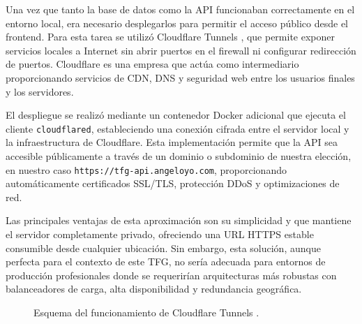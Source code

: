 Una vez que tanto la base de datos como la API funcionaban correctamente en el entorno local, era necesario desplegarlos para permitir el acceso público desde el frontend. Para esta tarea se utilizó Cloudflare Tunnels \cite{cloudflaretunnels}, que permite exponer servicios locales a Internet sin abrir puertos en el firewall ni configurar redirección de puertos. Cloudflare \cite{cloudflare} es una empresa que actúa como intermediario proporcionando servicios de CDN, DNS y seguridad web entre los usuarios finales y los servidores.

El despliegue se realizó mediante un contenedor Docker adicional que ejecuta el cliente \texttt{cloudflared}, estableciendo una conexión cifrada entre el servidor local y la infraestructura de Cloudflare. Esta implementación permite que la API sea accesible públicamente a través de un dominio o subdominio de nuestra elección, en nuestro caso \texttt{https://tfg-api.angeloyo.com}, proporcionando automáticamente certificados SSL/TLS, protección DDoS y optimizaciones de red.

Las principales ventajas de esta aproximación son su simplicidad y que mantiene el servidor completamente privado, ofreciendo una URL HTTPS estable consumible desde cualquier ubicación. Sin embargo, esta solución, aunque perfecta para el contexto de este TFG, no sería adecuada para entornos de producción profesionales donde se requerirían arquitecturas más robustas con balanceadores de carga, alta disponibilidad y redundancia geográfica.  


\begin{figure}[H]
  \centering
  \caption{Esquema del funcionamiento de Cloudflare Tunnels \cite{cloudflaretunnels}.}
  \label{fig:cloudflared}
\end{figure}


